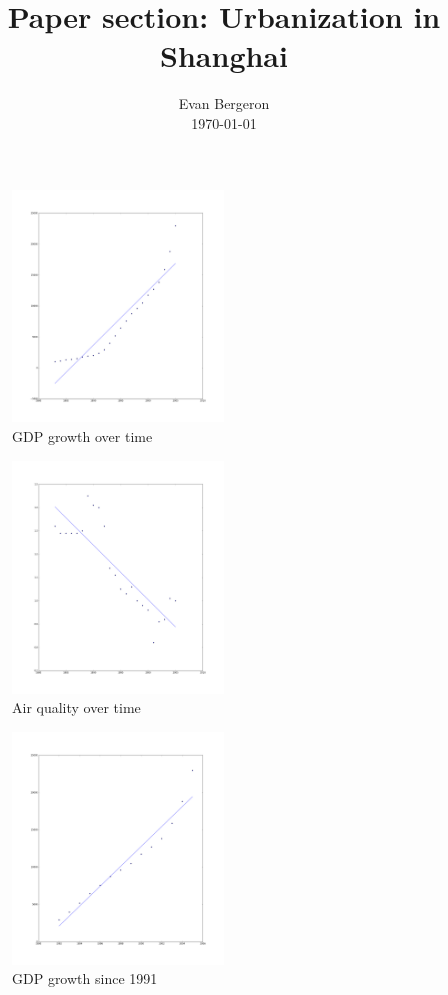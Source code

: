 \documentclass{amsart}
\title{Paper section: Urbanization in Shanghai}
\author{Evan Bergeron\\
\today
}
\begin{document}
\maketitle

\begin{figure}[h]
\centering
\includegraphics[width=0.5\textwidth]{img/growth_gdp}
\caption{GDP growth over time}
\end{figure}

\begin{figure}[h]
\centering
\includegraphics[width=0.5\textwidth]{img/air_quality}
\caption{Air quality over time}
\end{figure}

\begin{figure}[h]
\centering
\includegraphics[width=0.5\textwidth]{img/growth_gdp_1991}
\caption{GDP growth since 1991}
\end{figure}
\end{document}
